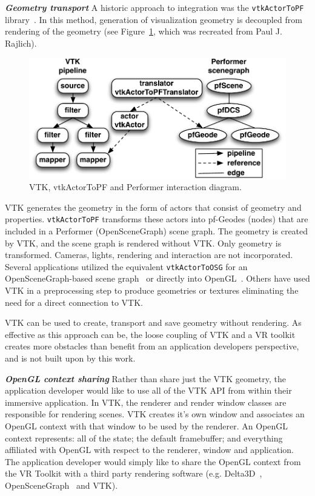 \textbf{\textit{Geometry transport}} A historic approach to integration was the \texttt{vtkActorToPF} library~\cite{Leigh98limbo/vtk}. In this method, generation of visualization geometry is decoupled from  rendering of the geometry (see Figure~\ref{fig:vtkActorToPF}, which was recreated from Paul J. Rajlich). 

\begin{figure}[h!]
 \centering
  \includegraphics[width=\linewidth]{images/vtkActorToPF.pdf}
  \caption{VTK, vtkActorToPF and Performer interaction diagram.}
\label{fig:vtkActorToPF}
\end{figure}

\noindent 
VTK generates the geometry in the form of actors that consist of geometry and properties.  \texttt{vtkActorToPF} transforms these actors into pf-Geodes (nodes) that are included in a Performer (OpenSceneGraph) scene graph. The geometry is created by VTK, and the scene graph is rendered without VTK. Only geometry is transformed. Cameras, lights, rendering and interaction are not incorporated. Several applications utilized the equivalent \texttt{vtkActorToOSG} for an OpenSceneGraph-based scene graph~\cite{VE-Suite:2016} or directly into OpenGL~\cite{Ohno:2006}. Others have used VTK in a preprocessing step to produce geometries or textures eliminating the need for a direct connection to VTK\cite{Bivins:2005}.

VTK can be used to create, transport and save geometry without rendering. As effective as this approach can be, the loose coupling of VTK and a VR toolkit creates more obstacles than benefit from an application developers perspective, and is not built upon by this work.

\textbf{\textit{OpenGL context sharing}} Rather than share just the VTK geometry, the application developer would like to use all of the VTK API from within their immersive application. In VTK, the renderer and render window classes are responsible for rendering scenes. VTK creates it's own window and associates an OpenGL context with that window to be used by the renderer. An OpenGL context represents: all of the state; the default framebuffer; and everything affiliated with OpenGL with respect to the renderer, window and application. The application developer would simply like to share the OpenGL context from the VR Toolkit with a third party rendering software (e.g. Delta3D~\cite{McDowell:2006}, OpenSceneGraph~\cite{Wang:2010} and VTK). 

